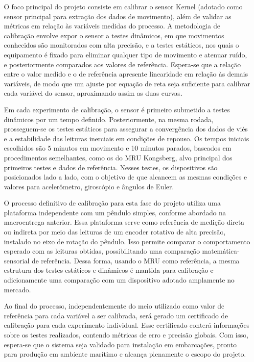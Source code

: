 \documentclass[a4paper, 12pt]{article}
\begin{document}
    O foco principal do projeto consiste em calibrar o sensor Kernel (adotado como sensor principal para extração dos dados de movimento), além de validar as métricas em relação às variáveis medidas do processo. A metodologia de calibração envolve expor o sensor a testes dinâmicos, em que movimentos conhecidos são monitorados com alta precisão, e a testes estáticos, nos quais o equipamento é fixado para eliminar qualquer tipo de movimento e atenuar ruído, e posteriormente comparados aos valores de referência. Espera-se que a relação entre o valor medido e o de referência apresente linearidade em relação às demais variáveis, de modo que um ajuste por equação de reta seja suficiente para calibrar cada variável do sensor, aproximando assim as duas curvas.
    
    Em cada experimento de calibração, o sensor é primeiro submetido a testes dinâmicos por um tempo definido. Posteriormente, na mesma rodada, prosseguem-se os testes estáticos para assegurar a convergência dos dados de viés e a estabilidade das leituras inerciais em condições de repouso. Os tempos iniciais escolhidos são 5 minutos em movimento e 10 minutos parados, baseados em procedimentos semelhantes, como os do MRU Kongsberg, alvo principal dos primeiros testes e dados de referência. Nesses testes, os dispositivos são posicionados lado a lado, com o objetivo de que alcancem as mesmas condições e valores para acelerômetro, giroscópio e ângulos de Euler.
    
    O processo definitivo de calibração para esta fase do projeto utiliza uma plataforma independente com um pêndulo simples, conforme abordado na macroentrega anterior. Essa plataforma serve como referência de medição direta ou indireta por meio das leituras de um encoder rotativo de alta precisão, instalado no eixo de rotação do pêndulo. Isso permite comparar o comportamento esperado com as leituras obtidas, possibilitando uma comparação matemática-sensorial de referência. Dessa forma, usando o MRU como referência, a mesma estrutura dos testes estáticos e dinâmicos é mantida para calibração e adicionamente uma comparação com um dispositivo adotado amplamente no mercado.
    
    Ao final do processo, independentemente do meio utilizado como valor de referência para cada variável a ser calibrada, será gerado um certificado de calibração para cada experimento individual. Esse certificado conterá informações sobre os testes realizados, contendo métricas de erro e precisão globais. Com isso, espera-se que o sistema seja validado para instalação em embarcações, pronto para produção em ambiente marítimo e alcança plenamente o escopo do projeto.
\end{document}
